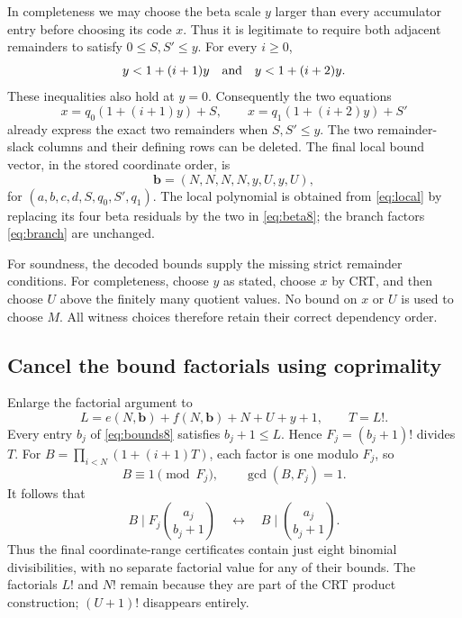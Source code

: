 \documentclass[11pt,a4paper]{article}
\theoremstyle{definition}\newtheorem{definition}[theorem]{Definition}
\theoremstyle{remark}\newtheorem{remark}[theorem]{Remark}
\numberwithin{equation}{section}
\begin{document}
In completeness we may choose the beta scale \(y\) larger than every
accumulator entry before choosing its code \(x\). Thus it is legitimate
to require both adjacent remainders to satisfy \(0\le S,S'\le y\).
For every \(i\ge0\),
\[
 y<1+(i+1)y\quad\hbox{and}\quad y<1+(i+2)y.
\]
These inequalities also hold at \(y=0\). Consequently the two equations
\begin{equation}
 x=q_0(1+(i+1)y)+S,\qquad
 x=q_1(1+(i+2)y)+S'
 \label{eq:beta8}
\end{equation}
already express the exact two remainders when \(S,S'\le y\).
The two remainder-slack columns and their defining rows can be deleted.
The final local bound vector, in the stored coordinate order, is
\begin{equation}
 \boldsymbol b=(N,N,N,N,y,U,y,U),
 \label{eq:bounds8}
\end{equation}
for \((a,b,c,d,S,q_0,S',q_1)\). The local polynomial is obtained from
\eqref{eq:local} by replacing its four beta residuals by the two in
\eqref{eq:beta8}; the branch factors \eqref{eq:branch} are unchanged.

For soundness, the decoded bounds supply the missing strict remainder
conditions. For completeness, choose \(y\) as stated, choose \(x\) by
CRT, and then choose \(U\) above the finitely many quotient values.
No bound on \(x\) or \(U\) is used to choose \(M\). All witness
choices therefore retain their correct dependency order.

\subsection{Cancel the bound factorials using coprimality}

Enlarge the factorial argument to
\begin{equation}
 L=e(N,\boldsymbol b)+f(N,\boldsymbol b)+N+U+y+1,
 \qquad T=L!.
 \label{eq:L8}
\end{equation}
Every entry \(b_j\) of \eqref{eq:bounds8} satisfies \(b_j+1\le L\).
Hence \(F_j=(b_j+1)!\) divides \(T\). For
\(B=\prod_{i<N}(1+(i+1)T)\), each factor is one modulo \(F_j\), so
\begin{equation}
 B\equiv1\pmod{F_j},\qquad \gcd(B,F_j)=1.
 \label{eq:factorialunit}
\end{equation}
It follows that
\begin{equation}
 B\mid F_j\binom{a_j}{b_j+1}
 \quad\longleftrightarrow\quad
 B\mid\binom{a_j}{b_j+1}.
 \label{eq:cancel}
\end{equation}
Thus the final coordinate-range certificates contain just eight binomial
divisibilities, with no separate factorial value for any of their bounds.
The factorials \(L!\) and \(N!\) remain because they are part of the
CRT product construction; \((U+1)!\) disappears entirely.
\end{document}
